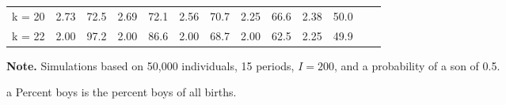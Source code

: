 \documentclass[12pt,letterpaper]{article}
\begin{document}
\begin{table}[!htp]
\begin{threeparttable}
\begin{tabular}{@{} c D{.}{.}{1.2} D{.}{.}{1.2} D{.}{.}{1.2} D{.}{.}{2.2} D{.}{.}{1.2} D{.}{.}{1.2} D{.}{.}{2.2} D{.}{.}{1.2} D{.}{.}{1.2} D{.}{.}{2.2} D{.}{.}{1.2} D{.}{.}{1.2} @{}}
 k = 20        &  2.73 &  72.5 &  2.69 &  72.1 &  2.56 &  70.7 &  2.25 &  66.6 &  2.38 &  50.0 \\
 k = 22        &  2.00 &  97.2 &  2.00 &  86.6 &  2.00 &  68.7 &  2.00 &  62.5 &  2.25 &  49.9 \\
\bottomrule
\end{tabular}
\begin{tablenotes} \scriptsize
\item \hspace*{-0.5em} \textbf{Note.} Simulations based on  50,000 individuals, 15 periods, $ I = 200 $,
 and a probability of a son of 0.5.
\item[a]Percent boys is the percent boys of all births.
\end{tablenotes}
\end{threeparttable}
\normalsize
\end{table}
\end{document}
